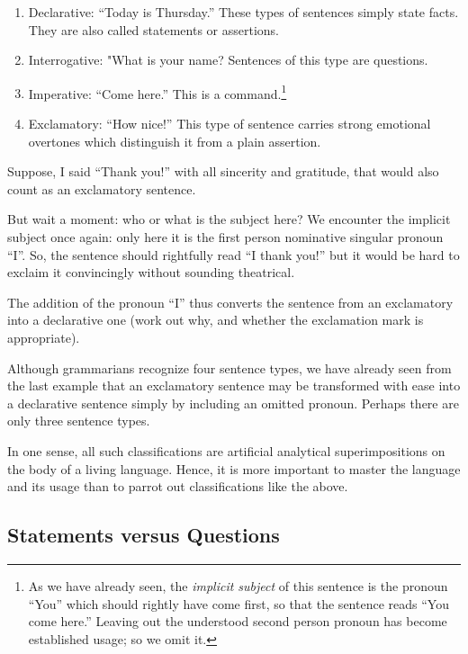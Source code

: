 \documentclass[
  11pt,
  british,
  a4paper,
]{article}
\begin{document}
\begin{enumerate}
\item
  Declarative: ``Today is Thursday.'' These types of sentences simply
  state facts. They are also called statements or assertions.
\item
  Interrogative: "What is your name? Sentences of this type are
  questions.
\item
  Imperative: ``Come here.'' This is a command.\footnote{ As we have
    already seen, the \emph{implicit subject} of this sentence is the
    pronoun ``You'' which should rightly have come first, so that the
    sentence reads ``You come here.'' Leaving out the understood second
    person pronoun has become established usage; so we omit it.}
\item
  Exclamatory: ``How nice!'' This type of sentence carries strong
  emotional overtones which distinguish it from a plain assertion.
\end{enumerate}

Suppose, I said ``Thank you!'' with all sincerity and gratitude, that
would also count as an exclamatory sentence.

But wait a moment: who or what is the subject here? We encounter the
implicit subject once again: only here it is the first person nominative
singular pronoun ``I''. So, the sentence should rightfully read ``I
thank you!'' but it would be hard to exclaim it convincingly without
sounding theatrical.

The addition of the pronoun ``I'' thus converts the sentence from an
exclamatory into a declarative one (work out why, and whether the
exclamation mark is appropriate).

Although grammarians recognize four sentence types, we have already seen
from the last example that an exclamatory sentence may be transformed
with ease into a declarative sentence simply by including an omitted
pronoun. Perhaps there are only three sentence types.

In one sense, all such classifications are artificial analytical
superimpositions on the body of a living language. Hence, it is more
important to master the language and its usage than to parrot out
classifications like the above.

\hypertarget{statements-versus-questions}{%
\subsection{Statements versus
Questions}\label{statements-versus-questions}}
\end{document}
